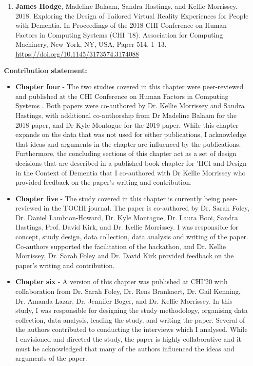 \begin{enumerate}
    \item \textbf{James Hodge}, Madeline Balaam, Sandra Hastings, and Kellie Morrissey. 2018. Exploring the Design of Tailored Virtual Reality Experiences for People with Dementia. In Proceedings of the 2018 CHI Conference on Human Factors in Computing Systems (CHI '18). Association for Computing Machinery, New York, NY, USA, Paper 514, 1–13. \href{https://doi.org/10.1145/3173574.3174088}{https://doi.org/10.1145/3173574.3174088}

\end{enumerate}
\textbf{Contribution statement:} 
\begin{itemize}
    \item \textbf{Chapter four} - The two studies covered in this chapter were peer-reviewed and published at the CHI Conference on Human Factors in Computing Systems \citep{hodge_exploring_2018,hodge_exploring_2019}. Both papers were co-authored by Dr. Kellie Morrissey and Sandra Hastings, with additional co-authorship from Dr Madeline Balaam for the 2018 paper, and Dr Kyle Montague for the 2019 paper. While this chapter expands on the data that was not used for either publications, I acknowledge that ideas and arguments in the chapter are influenced by the publications. Furthermore, the concluding sections of this chapter act as a set of design decisions that are described in a published book chapter for 'HCI and Design in the Context of Dementia \citep{hodge2020sharing} that I co-authored with Dr Kellie Morrissey who provided feedback on the paper's writing and contribution. 

    \item \textbf{Chapter five} - The study covered in this chapter is currently being peer-reviewed in the TOCHI journal. The paper is co-authored by Dr. Sarah Foley, Dr. Daniel Lambton-Howard, Dr. Kyle Montague, Dr. Laura Booi, Sandra Hastings, Prof. David Kirk, and Dr. Kellie Morrissey. I was responsible for concept, study design, data collection, data analysis and writing of the paper. Co-authors supported the facilitation of the hackathon, and Dr. Kellie Morrissey, Dr. Sarah Foley and Dr. David Kirk provided feedback on the paper's writing and contribution.
    
    \item \textbf{Chapter six} - A version of this chapter was published at CHI'20 \citep{hodge_relational_2020} with collaboration from  Dr. Sarah Foley, Dr. Rens Brankaert, Dr. Gail Kenning, Dr. Amanda Lazar, Dr. Jennifer Boger, and Dr. Kellie Morrissey. In this study, I was responsible for designing the study methodology, organising data collection, data analysis, leading the study, and writing the paper. Several of the authors contributed to conducting the interviews which I analysed. While I envisioned and directed the study, the paper is highly collaborative and it must be acknowledged that many of the authors influenced the ideas and arguments of the paper.


\end{itemize}
